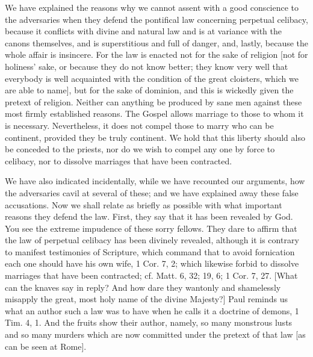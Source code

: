 We have explained the reasons why we cannot assent with a good
conscience to the adversaries when they defend the pontifical law
concerning perpetual celibacy, because it conflicts with divine and
natural law and is at variance with the canons themselves, and is
superstitious and full of danger, and, lastly, because the whole
affair is insincere.  For the law is enacted not for the sake of
religion [not for holiness' sake, or because they do not know better;
they know very well that everybody is well acquainted with the
condition of the great cloisters, which we are able to name], but for
the sake of dominion, and this is wickedly given the pretext of
religion.  Neither can anything be produced by sane men against these
most firmly established reasons.  The Gospel allows marriage to those
to whom it is necessary.  Nevertheless, it does not compel those to
marry who can be continent, provided they be truly continent.  We
hold that this liberty should also be conceded to the priests, nor do
we wish to compel any one by force to celibacy, nor to dissolve
marriages that have been contracted.

We have also indicated incidentally, while we have recounted our
arguments, how the adversaries cavil at several of these; and we have
explained away these false accusations.  Now we shall relate as
briefly as possible with what important reasons they defend the law.
First, they say that it has been revealed by God.  You see the
extreme impudence of these sorry fellows.  They dare to affirm that
the law of perpetual celibacy has been divinely revealed, although it
is contrary to manifest testimonies of Scripture, which command that
to avoid fornication each one should have his own wife, 1 Cor. 7, 2;
which likewise forbid to dissolve marriages that have been contracted;
cf.  Matt. 6, 32; 19, 6; 1 Cor. 7, 27. [What can the knaves say in
reply?  And how dare they wantonly and shamelessly misapply the great,
most holy name of the divine Majesty?] Paul reminds us what an
author such a law was to have when he calls it a doctrine of demons,
1 Tim. 4, 1. And the fruits show their author, namely, so many
monstrous lusts and so many murders which are now committed under the
pretext of that law [as can be seen at Rome].

